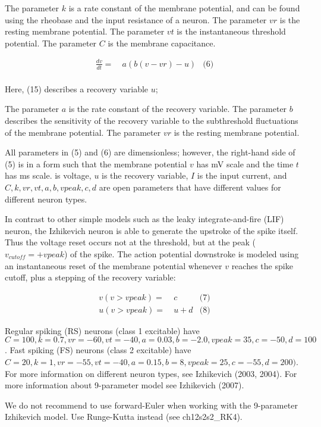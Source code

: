 The parameter $k$ is a rate constant of the membrane potential, and can be found using the rheobase and the input resistance of a neuron. The parameter $vr$ is the resting membrane potential. The parameter $vt$ is the instantaneous threshold potential. The parameter $C$ is the membrane capacitance.

\begin{align*} \frac{dv}{dt} = & ~ a (b (v - vr) - u) & \text{(6)}\\ \end{align*}

Here, (15) describes a recovery variable $u$;

The parameter $a$ is the rate constant of the recovery variable. The parameter $b$ describes the sensitivity of the recovery variable to the subthreshold fluctuations of the membrane potential. The parameter $vr$ is the resting membrane potential.

All parameters in (5) and (6) are dimensionless; however, the right-\/hand side of (5) is in a form such that the membrane potential $v$ has mV scale and the time $t$ has ms scale. is voltage, $u$ is the recovery variable, $I$ is the input current, and $C, k, vr, vt, a, b, vpeak, c, d$ are open parameters that have different values for different neuron types.

In contrast to other simple models such as the leaky integrate-\/and-\/fire (L\+IF) neuron, the Izhikevich neuron is able to generate the upstroke of the spike itself. Thus the voltage reset occurs not at the threshold, but at the peak ( $v_{cutoff}=+vpeak$) of the spike. The action potential downstroke is modeled using an instantaneous reset of the membrane potential whenever $v$ reaches the spike cutoff, plus a stepping of the recovery variable\+:

\begin{align*} v(v>vpeak) = & ~ c & \text{(7)}\\ u(v>vpeak) = & ~ u + d & \text{(8)}\end{align*}

Regular spiking (RS) neurons (class 1 excitable) have $C=100, k=0.7, vr=-60, vt=-40, a=0.03, b=-2.0, vpeak=35, c=-50, d=100$. Fast spiking (FS) neurons (class 2 excitable) have $C=20, k=1, vr=-55, vt=-40, a=0.15, b=8, vpeak=25, c=-55, d=200)$. For more information on different neuron types, see Izhikevich (2003, 2004). For more information about 9-\/parameter model see Izhikevich (2007).

We do not recommend to use forward-\/\+Euler when working with the 9-\/parameter Izhikevich model. Use Runge-\/\+Kutta instead (see ch12s2s2\+\_\+\+R\+K4).

